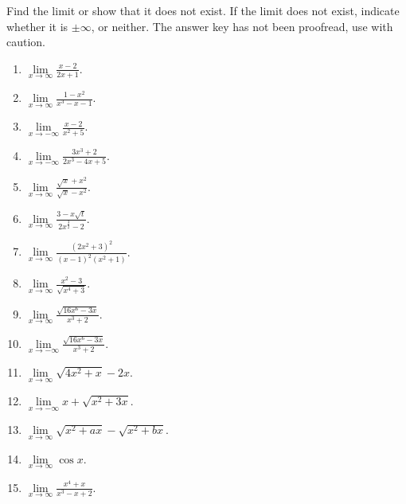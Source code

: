 Find the limit or show that it does not exist. If the limit does not exist, indicate whether it is $\pm\infty$, or neither. The answer key has not been proofread, use with caution.
\begin{multicols}{3}
\begin{enumerate}
\item $\lim\limits_{x\to\infty }\frac{x-2}{2x+1}$.

\item $\lim\limits_{x\to\infty }\frac{1-x^2}{x^3-x-1}$.

\item $\lim\limits_{x\to-\infty }\frac{x-2}{x^2+5}$.

\item $\lim\limits_{x\to-\infty }\frac{3x^3+2}{2x^3-4x+5}$.

\item $\lim\limits_{x\to\infty }\frac{\sqrt{x}+x^2}{\sqrt{x}-x^2}$.

\item $\lim\limits_{x\to\infty }\frac{3-x\sqrt{t}}{2x^{\frac{3}{2}}-2}$.

\item $\lim\limits_{x\to\infty }\frac{(2x^2+3)^2}{(x-1)^2(x^2+1)}$.

\item $\lim\limits_{x\to\infty }\frac{x^2-3}{\sqrt{x^4+3}}$.

\item $\lim\limits_{x\to\infty }\frac{\sqrt{16x^6-3x}}{x^3+2}$.

\item $\lim\limits_{x\to-\infty }\frac{\sqrt{16x^6-3x}}{x^3+2}$.

\item $\lim\limits_{x\to\infty}\sqrt{4x^2+x}-2x$.

\item $\lim\limits_{x\to-\infty} x+\sqrt{x^2+3x} $.

\item $\lim\limits_{x\to\infty}\sqrt{x^2+ax}-\sqrt{x^2+bx}$.

\item $\lim\limits_{x\to\infty}\cos x$.

\item $\lim\limits_{x\to\infty}\frac{x^4+x}{x^3-x+2}$.


\end{enumerate}
\end{multicols}

